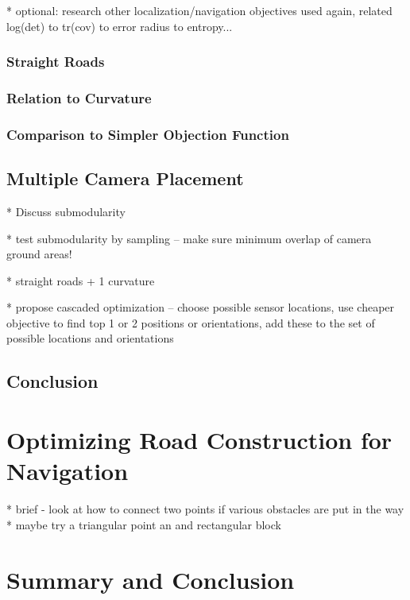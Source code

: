 \documentclass[a4paper,12pt,twoside,openright]{report}
\begin{document}
* optional: research other localization/navigation objectives used again, related log(det) to tr(cov) to error radius to entropy...
\subsection{Straight Roads}

\subsection{Relation to Curvature}

\subsection{Comparison to Simpler Objection Function}



\section{Multiple Camera Placement}
* Discuss submodularity

* test submodularity by sampling -- make sure minimum overlap of camera ground areas!

* straight roads + 1 curvature

* propose cascaded optimization -- choose possible sensor locations, use cheaper objective to find top 1 or 2 
positions or orientations, add these to the set of possible locations and orientations



\section{Conclusion}

\chapter{Optimizing Road Construction for Navigation}

* brief - look at how to connect two points if various obstacles are put in the way
* maybe try a triangular point an and rectangular block 


\chapter{Summary and Conclusion} 




\appendix
\singlespacing

\printbibliography
\end{document}
